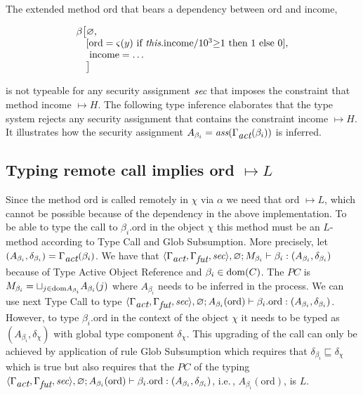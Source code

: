 \documentclass[10pt, conference, compsocconf]{IEEEtran}
\newcommand{\symb}[1]{\makebox{\it #1}}
\newcommand\dom{{\rm dom}}
\newcommand\ie{i.e.\!\,, }
\begin{document}
{The extended method ord that bears a dependency between ord and income,
\begin{small}
\[
 \begin{array}{l}
    \beta \big[\varnothing, \\
    \quad [ \text{ord} = \varsigma(y)\ \text{if}\ \text{{\it this}.income}\mathord{/}10^3 \mathord{\ge} 1\  \text{then}\
            1\ \text{else}\ 0 ],\\
    \  \quad \text{income} = \ldots\\
    \quad \big]
 \end{array}
\]
\end{small}
is not typeable for any security assignment $\symb{sec}$ that imposes the constraint that
method income $\mapsto H$. 
The following type inference elaborates that the type system rejects any
security assignment that contains the constraint income $\mapsto H$. 
It illustrates how the security assignment $A_{\beta_i} = \symb{ass}(\Gamma_{\symb{act}}(\beta_i))$ is inferred.

\subsection*{Typing remote call implies ord $\mapsto L$}
Since the method ord is called remotely in $\chi$ via $\alpha$ we need that ord $\mapsto L$,
which cannot be possible because of the dependency in the above implementation.
To be able to type the call to $\beta_i.\text{ord}$ in the object  $\chi$ 
this method must be an $L$-method according to {\sc Type Call} and {\sc Glob Subsumption}.
More precisely, let $(A_{\beta_i}, \delta_{\beta_i}) = \Gamma_{\symb{act}}(\beta_i)$.
We have that 
$\langle \Gamma_{\symb{act}}, \Gamma_{\symb{fut}}, \symb{sec} \rangle, \varnothing; M_{\beta_i} \vdash \beta_i: (A_{\beta_i}, \delta_{\beta_i})$ because of {\sc Type Active Object Reference} and $\beta_i \in \dom(C)$.
The $PC$ is $M_{\beta_i} = \sqcup_{j \in \dom{A_{\beta_i}}} A_{\beta_i}(j)$ where $A_{\beta_i}$ needs to be inferred 
in the process. We can use next {\sc Type Call} to type 
$\langle \Gamma_{\symb{act}}, \Gamma_{\symb{fut}}, \symb{sec} \rangle, \varnothing; A_{\beta_i}(\text{ord}) \vdash \beta_i.\text{ord}: (A_{\beta_i}, \delta_{\beta_i})$.
However, to type $\beta_i$.ord in the context of the object $\chi$ it needs to be typed as
$(A_{\beta_i}, \delta_{\chi})$ with global type component $\delta_\chi$. This upgrading of the
call can only be achieved by application of rule {\sc Glob Subsumption} which requires
that $\delta_{\beta_i} \sqsubseteq \delta_\chi$ which is true but also requires that the $PC$
of the typing $\langle \Gamma_{\symb{act}}, \Gamma_{\symb{fut}}, \symb{sec} \rangle, \varnothing; A_{\beta_i}(\text{ord}) \vdash \beta_i.\text{ord}: (A_{\beta_i}, \delta_{\beta_i})$, \ie $A_{\beta_i}(\text{ord})$, is $L$.

}
\end{document}
